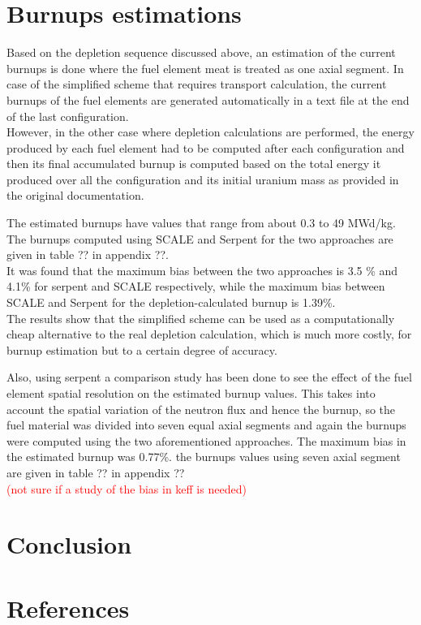 \documentclass[review,number,sort&compress,12pt]{elsarticle}
\begin{document}
\section{Burnups estimations}
Based on the depletion sequence discussed above, an estimation of the current burnups is done where the fuel element meat is treated as one axial segment.
In case of the simplified scheme that requires transport calculation, the current burnups of the fuel elements are generated automatically in a text file at the end of the last configuration.\\
However, in the other case where depletion calculations are performed, the energy produced by each fuel element had to be computed after each configuration and then its final accumulated burnup is computed based on the total energy it produced over all the configuration and its initial uranium mass as provided in the original documentation.

The estimated burnups have values that range from about 0.3 to 49 MWd/kg. The burnups computed using SCALE and Serpent for the two approaches are given in table ?? in appendix ??.\\
It was found that the maximum bias between the two approaches is 3.5 \% and 4.1\% for serpent and SCALE respectively, while the maximum bias between SCALE and Serpent for the depletion-calculated burnup is 1.39\%.\\
The results show that the simplified scheme can be used as a computationally cheap alternative to the real depletion calculation, which is much more costly, for burnup estimation but to a certain degree of accuracy.

Also, using serpent a comparison study has been done to see the effect of the fuel element spatial resolution on the estimated burnup values. This takes into account the spatial variation of the neutron flux and hence the burnup, so the fuel material was divided into seven equal axial segments and again the burnups were computed using the two aforementioned approaches. 
The maximum bias in the estimated burnup was 0.77\%. the burnups values using seven axial segment are given in table ?? in appendix ??\\ 
\textcolor{red}{(not sure if a study of the bias in keff is needed)}


\section{Conclusion}

\section*{References}

 

\end{document}
